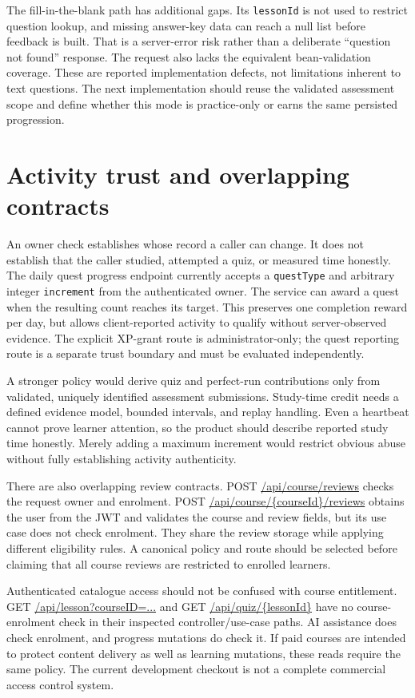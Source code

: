 \documentclass[12pt,a4paper,oneside]{report}
\begin{document}
The fill-in-the-blank path has additional gaps. Its \texttt{lessonId} is not used
to restrict question lookup, and missing answer-key data can reach a null list before
feedback is built. That is a server-error risk rather than a deliberate ``question
not found'' response. The request also lacks the equivalent bean-validation coverage.
These are reported implementation defects, not limitations inherent to text questions.
The next implementation should reuse the validated assessment scope and define
whether this mode is practice-only or earns the same persisted progression.

\section{Activity trust and overlapping contracts}
\label{sec:activity-trust}
An owner check establishes whose record a caller can change. It does not establish
that the caller studied, attempted a quiz, or measured time honestly. The daily quest
progress endpoint currently accepts a \texttt{questType} and arbitrary integer
\texttt{increment} from the authenticated owner. The service can award a quest when
the resulting count reaches its target. This preserves one completion reward per
day, but allows client-reported activity to qualify without server-observed evidence.
The explicit XP-grant route is administrator-only; the quest reporting route is a
separate trust boundary and must be evaluated independently.

A stronger policy would derive quiz and perfect-run contributions only from
validated, uniquely identified assessment submissions. Study-time credit needs a
defined evidence model, bounded intervals, and replay handling. Even a heartbeat
cannot prove learner attention, so the product should describe reported study time
honestly. Merely adding a maximum increment would restrict obvious abuse without
fully establishing activity authenticity.

There are also overlapping review contracts. POST \url{/api/course/reviews} checks
the request owner and enrolment. POST \url{/api/course/{courseId}/reviews} obtains
the user from the JWT and validates the course and review fields, but its use case
does not check enrolment. They share the review storage while applying different
eligibility rules. A canonical policy and route should be selected before claiming
that all course reviews are restricted to enrolled learners.

Authenticated catalogue access should not be confused with course entitlement.
GET \url{/api/lesson?courseID=...} and GET \url{/api/quiz/{lessonId}} have no
course-enrolment check in their inspected controller/use-case paths. AI assistance
does check enrolment, and progress mutations do check it. If paid courses are intended
to protect content delivery as well as learning mutations, these reads require the
same policy. The current development checkout is not a complete commercial access
control system.
\end{document}
